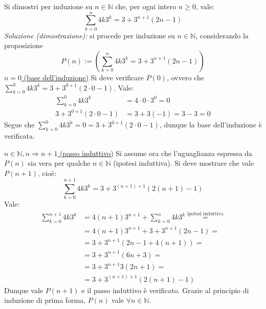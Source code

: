 \begin{tcolorbox}[enhanced, breakable, colback=blue!30, colframe=blue!30!black, title=Esempio]
Si dimostri per induzione su $n\in\mathbb{N}$ che, per ogni intero $n\geq0$,
vale: \[ \sum_{k=0}^{n}4k3^k=3+3^{n+1}(2n-1) \]
\textit{Soluzione (dimostrazione):} si procede per induzione su $n\in\mathbb{N}$,
considerando la proposizione \[P(n):=\left( \sum_{k=0}^{n}4k3^k=3+3^{n+1}(2n-1) \right)\]
\underline{$n=0$ (base dell'induzione)} Si deve verificare $P(0)$,
ovvero che $\sum_{k=0}^{0}4k3^k=3+3^{0+1}(2\cdot0-1)$.
Vale:
\begin{align*}
\sum_{k=0}^{0}4k3^k  &=4\cdot0\cdot3^0=0\\
3+3^{0+1}(2\cdot0-1) &=3+3(-1)=3-3=0
\end{align*}
Segue che $\sum_{k=0}^{0}4k3^k=0=3+3^{0+1}(2\cdot0-1)$, dunque la base
dell'induzione è verificata.

\underline{$n\in\mathbb{N},n\Longrightarrow n+1$ (passo induttivo)}
Si assume ora che l'uguaglianza espressa da $P(n)$ sia vera per
qualche $n\in\mathbb{N}$ (ipotesi induttiva). Si deve mostrare che
vale $P(n+1)$, cioè:
\[ \sum_{k=0}^{n+1}4k3^k=3+3^{(n+1)+1}(2(n+1)-1) \]
Vale:
\begin{align*}
\sum_{k=0}^{n+1}4k3^k &=4(n+1)3^{n+1} + \sum_{k=0}^{n}4k3^k \stackrel{\text{ipotesi induttiva}}{=}\\
                        &=4(n+1)3^{n+1} + 3+3^{n+1}(2n-1) =\\
                        &=3+3^{n+1}(2n-1+4(n+1)) =\\
                        &=3+3^{n+1}(6n+3) =\\
                        &=3+3^{n+1}3(2n+1) =\\
                        &=3+3^{(n+1)+1}(2(n+1)-1)
\end{align*}
Dunque vale $P(n+1)$ e il passo induttivo è verificato. Grazie al
principio di induzione di prima forma, $P(n)$ vale $\forall n\in\mathbb{N}$.
\end{tcolorbox}
